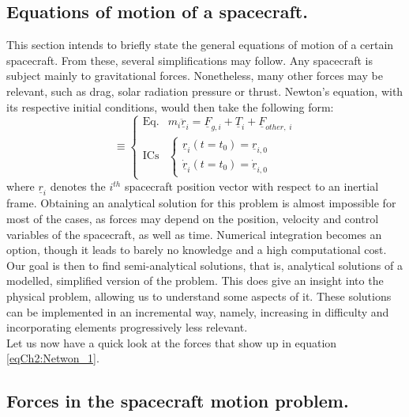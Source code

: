 	\subsection{Equations of motion of a spacecraft.}
	\indent This section intends to briefly state the general equations of motion of a certain spacecraft. From these, several simplifications may follow. Any spacecraft is subject mainly to gravitational forces. Nonetheless, many other forces may be relevant, such as drag, solar radiation pressure or thrust. Newton's equation, with its respective initial conditions, would then take the following form:
	\begin{equation}
	[P]\equiv\left\{ \begin{array}{lcc}
	\text{Eq.} & m_i \ddot{\underline{r}}_i = \underline{F}_{g, i} + \underline{T}_i + \underline{F}_{other,\; i}\\[1em]
	\text{ICs} & \left\{ \begin{array}{ll}
	\underline{r}_{i} (t = t_0) = \underline{r}_{i, 0} \\
	\dot{\underline{r}}_{i} (t = t_0) = \dot{\underline{r}}_{i, 0} 
	\end{array}\right.
	\end{array}\right.
	\label{eqCh2:Netwon_1}
	\end{equation}
	\noindent where $\underline{r}_i$ denotes the $i^{th}$ spacecraft position vector with respect to an inertial frame. Obtaining an analytical solution for this problem is almost impossible for most of the cases, as forces may depend on the position, velocity and control variables of the spacecraft, as well as time. Numerical integration becomes an option, though it leads to barely no knowledge and a high computational cost. Our goal is then to find semi-analytical solutions, that is, analytical solutions of a modelled, simplified version of the problem. This does give an insight into the physical problem, allowing us to understand some aspects of it. These solutions can be implemented in an incremental way, namely, increasing in difficulty and incorporating elements progressively less relevant. \\
	\indent Let us now have a quick look at the forces that show up in equation \eqref{eqCh2:Netwon_1}.
		\subsection{Forces in the spacecraft motion problem.}
